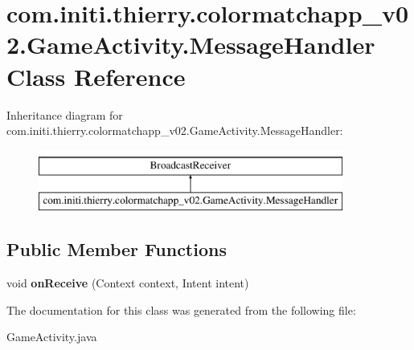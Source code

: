 \hypertarget{classcom_1_1initi_1_1thierry_1_1colormatchapp__v02_1_1_game_activity_1_1_message_handler}{}\section{com.\+initi.\+thierry.\+colormatchapp\+\_\+v02.\+Game\+Activity.\+Message\+Handler Class Reference}
\label{classcom_1_1initi_1_1thierry_1_1colormatchapp__v02_1_1_game_activity_1_1_message_handler}
Inheritance diagram for com.\+initi.\+thierry.\+colormatchapp\+\_\+v02.\+Game\+Activity.\+Message\+Handler\+:\begin{figure}[H]
\begin{center}
\leavevmode
\includegraphics[height=2.000000cm]{classcom_1_1initi_1_1thierry_1_1colormatchapp__v02_1_1_game_activity_1_1_message_handler}
\end{center}
\end{figure}
\subsection*{Public Member Functions}
\begin{DoxyCompactItemize}
\item 
void {\bfseries on\+Receive} (Context context, Intent intent)\hypertarget{classcom_1_1initi_1_1thierry_1_1colormatchapp__v02_1_1_game_activity_1_1_message_handler_a60221e59c4655c77619a8b5332f89288}{}\label{classcom_1_1initi_1_1thierry_1_1colormatchapp__v02_1_1_game_activity_1_1_message_handler_a60221e59c4655c77619a8b5332f89288}

\end{DoxyCompactItemize}


The documentation for this class was generated from the following file\+:\begin{DoxyCompactItemize}
\item 
Game\+Activity.\+java\end{DoxyCompactItemize}
